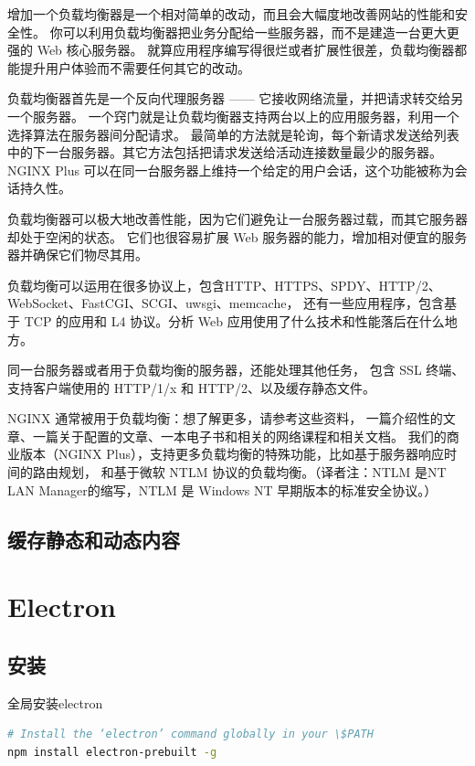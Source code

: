 \documentclass{book}
\begin{document}
增加一个负载均衡器是一个相对简单的改动，而且会大幅度地改善网站的性能和安全性。
你可以利用负载均衡器把业务分配给一些服务器，而不是建造一台更大更强的 Web 核心服务器。
就算应用程序编写得很烂或者扩展性很差，负载均衡器都能提升用户体验而不需要任何其它的改动。

负载均衡器首先是一个反向代理服务器 —— 它接收网络流量，并把请求转交给另一个服务器。
一个窍门就是让负载均衡器支持两台以上的应用服务器，利用一个选择算法在服务器间分配请求。
最简单的方法就是轮询，每个新请求发送给列表中的下一台服务器。其它方法包括把请求发送给活动连接数量最少的服务器。
NGINX Plus 可以在同一台服务器上维持一个给定的用户会话，这个功能被称为会话持久性。

负载均衡器可以极大地改善性能，因为它们避免让一台服务器过载，而其它服务器却处于空闲的状态。
它们也很容易扩展 Web 服务器的能力，增加相对便宜的服务器并确保它们物尽其用。

负载均衡可以运用在很多协议上，包含HTTP、HTTPS、SPDY、HTTP/2、WebSocket、FastCGI、SCGI、uwsgi、memcache，
还有一些应用程序，包含基于 TCP 的应用和 L4 协议。分析 Web 应用使用了什么技术和性能落后在什么地方。

同一台服务器或者用于负载均衡的服务器，还能处理其他任务，
包含 SSL 终端、支持客户端使用的 HTTP/1/x 和 HTTP/2、以及缓存静态文件。

NGINX 通常被用于负载均衡：想了解更多，请参考这些资料，
一篇介绍性的文章、一篇关于配置的文章、一本电子书和相关的网络课程和相关文档。
我们的商业版本（NGINX Plus），支持更多负载均衡的特殊功能，比如基于服务器响应时间的路由规划，
和基于微软 NTLM 协议的负载均衡。（译者注：NTLM 是NT LAN Manager的缩写，NTLM 是 Windows NT 早期版本的标准安全协议。）

\subsection{缓存静态和动态内容}

\section{Electron}

\subsection{安装}

全局安装electron

\begin{lstlisting}[language=Bash]
# Install the ‘electron’ command globally in your \$PATH
npm install electron-prebuilt -g
\end{lstlisting}
\end{document}
